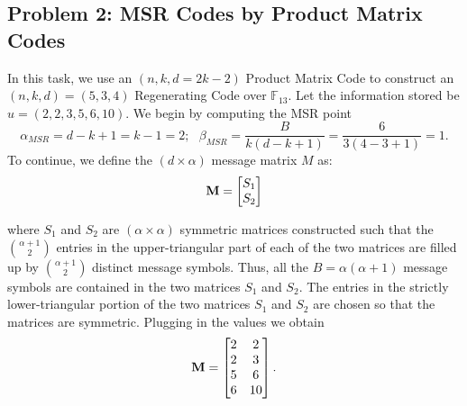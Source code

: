 \documentclass{article}
\begin{document}
\subsection*{Problem 2: MSR Codes by Product Matrix Codes}
In this task, we use an $(n,k,d=2k-2)$ Product Matrix Code \cite{Prodict_Matrix} to construct an $(n, k, d) = (5, 3, 4)$ Regenerating Code over $\mathbb{F}_{13}$. Let the information stored be $u = (2, 2, 3, 5, 6, 10)$. 
We begin by computing the MSR point
\begin{equation*}
\alpha_{MSR} = d - k +1 = k-1 = 2; \text{ }
\beta_{MSR}=\dfrac{B}{k(d-k+1)}=\dfrac{6}{3(4-3+1)}=1.
\end{equation*}
To continue, we define the $(d \times \alpha)$ message matrix $M$ as:
\begin{equation*}
\vb{M} = \begin{bmatrix} S_1\\ S_2 \end{bmatrix}
\end{equation*} 

where $S_1$ and $S_2$ are $(\alpha \times \alpha)$ symmetric matrices constructed such that the ${\alpha + 1}\choose{2}$ entries in the upper-triangular part of each of the two matrices are filled up by ${\alpha + 1}\choose{2}$ distinct message symbols. Thus, all the $B=\alpha(\alpha+1)$ message symbols are contained in the two matrices $S_1$ and $S_2$. The entries in the strictly lower-triangular portion of the two matrices $S_1$ and $S_2$ are chosen so that the matrices are symmetric. Plugging in the values we obtain
\begin{equation*}
\vb{M} =
\begin{bmatrix}
2 & 2 \\
2 & 3 \\
5 & 6 \\
6 & 10 \\
\end{bmatrix}.
\end{equation*}
\end{document}
